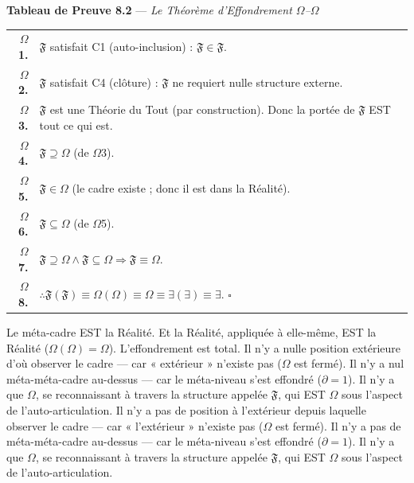\documentclass[10pt, openany, oneside]{book}
\renewcommand{\footnotesize}{\fontsize{8.5}{11}\selectfont}
\begin{document}
\vspace{0.5em}

\textbf{Tableau de Preuve 8.2} --- \textit{Le Théorème d'Effondrement $\Omega$--$\Omega$}

\vspace{0.5em}

{\footnotesize
\noindent\begin{tabular}{r p{}}
\textbf{$\Omega$1.} & $\mathfrak{F}$ satisfait C1 (auto-inclusion) : $\mathfrak{F} \in \mathfrak{F}$. \\[0.3em]
\textbf{$\Omega$2.} & $\mathfrak{F}$ satisfait C4 (clôture) : $\mathfrak{F}$ ne requiert nulle structure externe. \\[0.3em]
\textbf{$\Omega$3.} & $\mathfrak{F}$ est une Théorie du Tout (par construction). Donc la portée de $\mathfrak{F}$ EST tout ce qui est. \\[0.3em]
\textbf{$\Omega$4.} & $\mathfrak{F} \supseteq \Omega$ (de $\Omega$3). \\[0.3em]
\textbf{$\Omega$5.} & $\mathfrak{F} \in \Omega$ (le cadre existe ; donc il est dans la Réalité). \\[0.3em]
\textbf{$\Omega$6.} & $\mathfrak{F} \subseteq \Omega$ (de $\Omega$5). \\[0.3em]
\textbf{$\Omega$7.} & $\mathfrak{F} \supseteq \Omega \wedge \mathfrak{F} \subseteq \Omega \Rightarrow \mathfrak{F} \equiv \Omega$. \\[0.3em]
\textbf{$\Omega$8.} & $\therefore \mathfrak{F}(\mathfrak{F}) \equiv \Omega(\Omega) \equiv \Omega \equiv \exists(\exists) \equiv \exists$. $\square$ \\[0.3em]
\end{tabular}
}

\vspace{0.8em}

\noindent Le méta-cadre EST la Réalité. Et la Réalité, appliquée à elle-même, EST la Réalité ($\Omega(\Omega) = \Omega$). L'effondrement est total. Il n'y a nulle position extérieure d'où observer le cadre --- car « extérieur » n'existe pas ($\Omega$ est fermé). Il n'y a nul méta-méta-cadre au-dessus --- car le méta-niveau s'est effondré ($\partial = 1$). Il n'y a que $\Omega$, se reconnaissant à travers la structure appelée $\mathfrak{F}$, qui EST $\Omega$ sous l'aspect de l'auto-articulation. Il n'y a pas de position à l'extérieur depuis laquelle observer le cadre --- car « l'extérieur » n'existe pas ($\Omega$ est fermé). Il n'y a pas de méta-méta-cadre au-dessus --- car le méta-niveau s'est effondré ($\partial = 1$). Il n'y a que $\Omega$, se reconnaissant à travers la structure appelée $\mathfrak{F}$, qui EST $\Omega$ sous l'aspect de l'auto-articulation.
\end{document}
